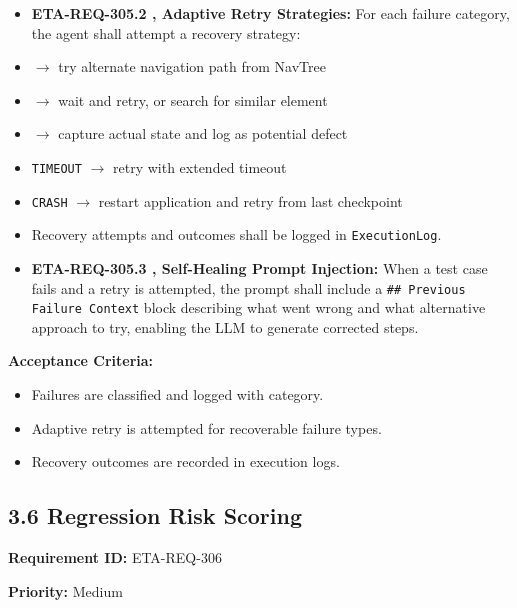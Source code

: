 \begin{itemize}[leftmargin=1.4em,itemsep=1pt,topsep=3pt]
  \item \textbf{ETA-REQ-305.2 ,  Adaptive Retry Strategies:} For each failure category, the agent shall attempt a recovery strategy:
  \item {} $\rightarrow$ try alternate navigation path from NavTree
  \item {} $\rightarrow$ wait and retry, or search for similar element
  \item {} $\rightarrow$ capture actual state and log as potential defect
  \item \texttt{TIMEOUT} $\rightarrow$ retry with extended timeout
  \item \texttt{CRASH} $\rightarrow$ restart application and retry from last checkpoint
  \item Recovery attempts and outcomes shall be logged in \texttt{ExecutionLog}.
\end{itemize}

\begin{itemize}[leftmargin=1.4em,itemsep=1pt,topsep=3pt]
  \item \textbf{ETA-REQ-305.3 ,  Self-Healing Prompt Injection:} When a test case fails and a retry is attempted, the prompt shall include a \texttt{\#\# Previous Failure Context} block describing what went wrong and what alternative approach to try, enabling the LLM to generate corrected steps.
\end{itemize}

\textbf{Acceptance Criteria:}
\begin{itemize}[leftmargin=1.4em,itemsep=1pt,topsep=3pt]
  \item Failures are classified and logged with category.
  \item Adaptive retry is attempted for recoverable failure types.
  \item Recovery outcomes are recorded in execution logs.
\end{itemize}

\subsection*{3.6 Regression Risk Scoring}

\textbf{Requirement ID:} ETA-REQ-306

\textbf{Priority:} Medium

